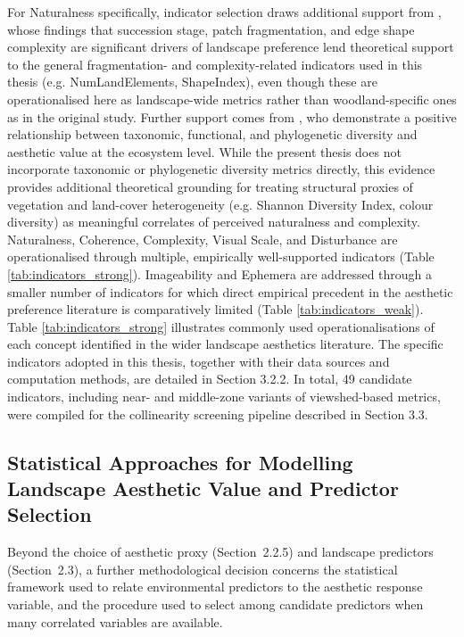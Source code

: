 \documentclass[hidelinks, 11pt]{article}
\begin{document}
For Naturalness specifically, indicator selection draws additional support from \citet{ode_indicators_2009}, whose findings that succession stage, patch fragmentation, and edge shape complexity are significant drivers of landscape preference lend theoretical support to the general fragmentation- and complexity-related indicators used in this thesis (e.g. NumLandElements, ShapeIndex), even though these are operationalised here as landscape-wide metrics rather than woodland-specific ones as in the original study. Further support comes from \citet{tribot_integrating_2018}, who demonstrate a positive relationship between taxonomic, functional, and phylogenetic diversity and aesthetic value at the ecosystem level. While the present thesis does not incorporate taxonomic or phylogenetic diversity metrics directly, this evidence provides additional theoretical grounding for treating structural proxies of vegetation and land-cover heterogeneity (e.g. Shannon Diversity Index, colour diversity) as meaningful correlates of perceived naturalness and complexity.
\\
Naturalness, Coherence, Complexity, Visual Scale, and Disturbance are operationalised through multiple, empirically well-supported indicators (Table \ref{tab:indicators_strong}). Imageability and Ephemera are addressed through a smaller number of indicators for which direct empirical precedent in the aesthetic preference literature is comparatively limited (Table \ref{tab:indicators_weak}). Table \ref{tab:indicators_strong} illustrates commonly used operationalisations of each concept identified in the wider landscape aesthetics literature. The specific indicators adopted in this thesis, together with their data sources and computation methods, are detailed in Section 3.2.2. In total, 49 candidate indicators, including near- and middle-zone variants of viewshed-based metrics, were compiled for the collinearity screening pipeline described in Section 3.3.



\subsection{Statistical Approaches for Modelling Landscape Aesthetic Value and Predictor Selection}\label{sec:ModelSOTA}

Beyond the choice of aesthetic proxy (Section~2.2.5) and landscape predictors (Section~2.3), a further methodological decision concerns the statistical framework used to relate environmental predictors to the aesthetic response variable, and the procedure used to select among candidate predictors when many correlated variables are available.
\end{document}
